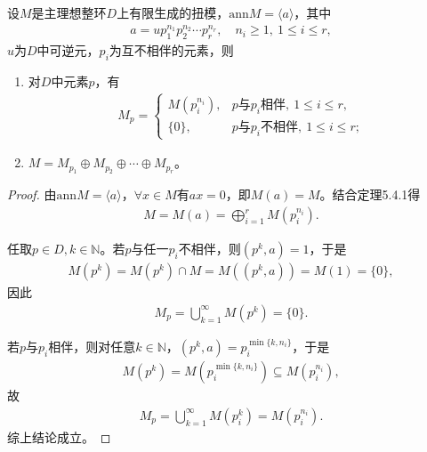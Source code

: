 \documentclass[../../main.tex]{subfiles}%
\begin{document}
\begin{theorem}
设$M$是主理想整环$D$上有限生成的扭模，$\mathrm{ann}M=\langle a\rangle$，其中
\begin{align*}
a=up_1^{n_1}p_2^{n_2}\cdots p_r^{n_r},\quad n_i\geqslant1,\ 1\leqslant i\leqslant r,
\end{align*}
$u$为$D$中可逆元，$p_i$为互不相伴的元素，则
\begin{enumerate}[(1)]
\item 对$D$中元素$p$，有
\begin{align*}
M_p=
\begin{cases}
M(p_i^{n_i}),& p\text{与}p_i\text{相伴},\ 1\leqslant i\leqslant r,\\
\{0\},& p\text{与}p_i\text{不相伴},\ 1\leqslant i\leqslant r;
\end{cases}
\end{align*}
\item $M=M_{p_1}\oplus M_{p_2}\oplus\cdots\oplus M_{p_r}$。
\end{enumerate}
\end{theorem}
\begin{proof}

由$\mathrm{ann}M=\langle a\rangle$，$\forall x\in M$有$ax=0$，即$M(a)=M$。结合定理5.4.1得
\begin{align*}
M=M(a)=\bigoplus\limits_{i=1}^{r}M(p_i^{n_i}).
\end{align*}

任取$p\in D,k\in\mathbb{N}$。若$p$与任一$p_i$不相伴，则$(p^k,a)=1$，于是
\begin{align*}
M(p^k)=M(p^k)\cap M=M((p^k,a))=M(1)=\{0\},
\end{align*}
因此
\begin{align*}
M_p=\bigcup\limits_{k=1}^{\infty}M(p^k)=\{0\}.
\end{align*}

若$p$与$p_i$相伴，则对任意$k\in\mathbb{N}$，$(p^k,a)=p_i^{\min\{k,n_i\}}$，于是
\begin{align*}
M(p^k)=M(p_i^{\min\{k,n_i\}})\subseteq M(p_i^{n_i}),
\end{align*}
故
\begin{align*}
M_p=\bigcup\limits_{k=1}^{\infty}M(p_i^k)=M(p_i^{n_i}).
\end{align*}
综上结论成立。

\end{proof}
\end{document}
